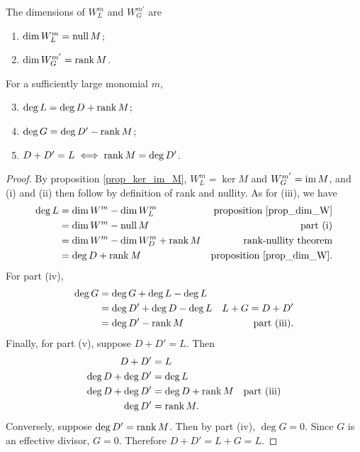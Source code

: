 \begin{proposition}
  \label{prop_deg_L_G}
  The dimensions of $W_L^m$ and $W_G^{m'}$ are
  \begin{enumerate}[label=(\roman*)]
    \item $\dim W_L^m    = \operatorname{null} M$;
    \item $\dim W_G^{m'} = \operatorname{rank} M$.
  \end{enumerate}
  For a sufficiently large monomial $m$,
  \begin{enumerate}[label=(\roman*)]
    \setcounter{enumi}{2}
    \item $\deg L = \deg D  + \operatorname{rank} M$;
    \item $\deg G = \deg D' - \operatorname{rank} M$;
    \item $D + D' = L \iff \operatorname{rank} M = \deg D'$.
  \end{enumerate}
\end{proposition}
\begin{proof}
  By proposition \ref{prop_ker_im_M}, $W_L^m = \ker M$ and $W_G^{m'} = \operatorname{im} M$,
  and (i) and (ii) then follow by definition of rank and nullity.
  As for (iii), we have
  \begin{align*}
    \deg L
      &= \dim W^m - \dim W_L^m & \text{proposition \ref{prop_dim_W}} \\
      &= \dim W^m - \operatorname{null} M & \text{part (i)} \\
      &= \dim W^m - \dim W_D^m + \operatorname{rank} M & \text{rank-nullity theorem} \\
      &= \deg D + \operatorname{rank} M & \text{proposition \ref{prop_dim_W}}.
  \end{align*}
  For part (iv),
  \begin{align*}
    \deg G
      &= \deg G + \deg L - \deg L \\
      &= \deg D' + \deg D - \deg L & L + G = D + D' \\
      &= \deg D' - \operatorname{rank} M & \text{part (iii)}.
  \end{align*}
  Finally, for part (v), suppose $D + D' = L$. Then
  \begin{align*}
    D + D' &= L \\
    \deg D + \deg D' &= \deg L \\
    \deg D + \deg D' &= \deg D + \operatorname{rank} M & \text{part (iii)} \\
    \deg D' &= \operatorname{rank} M.
  \end{align*}
  Conversely, suppose $\deg D' = \operatorname{rank} M$.
  Then by part (iv), $\deg G = 0$.
  Since $G$ is an effective divisor, $G = 0$.
  Therefore $D + D' = L + G = L$.
\end{proof}

